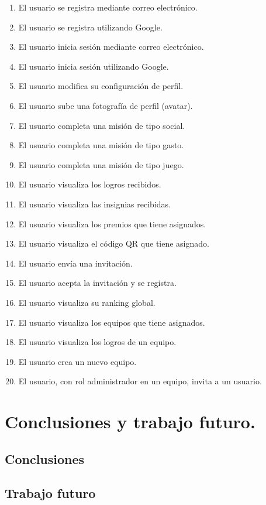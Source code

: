 \documentclass[twoside]{report}
\begin{document}
\begin{enumerate}

\item El usuario se registra mediante correo electrónico.
\item El usuario se registra utilizando Google.
\item El usuario inicia sesión mediante correo electrónico.
\item El usuario inicia sesión utilizando Google.
\item El usuario modifica su configuración de perfil.
\item El usuario sube una fotografía de perfil (avatar).
\item El usuario completa una misión de tipo social.
\item El usuario completa una misión de tipo gasto.
\item El usuario completa una misión de tipo juego.
\item El usuario visualiza los logros recibidos.
\item El usuario visualiza las insignias recibidas.
\item El usuario visualiza los premios que tiene asignados.
\item El usuario visualiza el código QR que tiene asignado.
\item El usuario envía una invitación.
\item El usuario acepta la invitación y se registra.
\item El usuario visualiza su ranking global.
\item El usuario visualiza los equipos que tiene asignados.
\item El usuario visualiza los logros de un equipo.
\item El usuario crea un nuevo equipo.
\item El usuario, con rol administrador en un equipo, invita a un usuario.
\end{enumerate}


\chapter{Conclusiones y trabajo futuro.}
\section{Conclusiones}
\section{Trabajo futuro}
\end{document}
